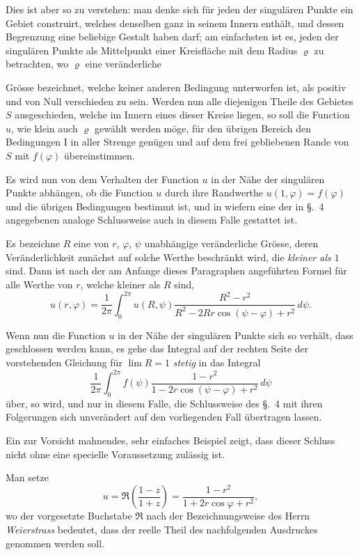 \documentclass{article}
\begin{document}
Dies ist aber so zu verstehen: man denke sich für jeden der singulären Punkte ein Gebiet construirt, welches denselben ganz in seinem Innern enthält, und dessen Begrenzung eine beliebige Gestalt haben darf; am einfachsten ist es, jeden der singulären Punkte als Mittelpunkt einer Kreisfläche mit dem Radius $\varrho$ zu betrachten, wo $\varrho$ eine veränderliche

Grösse bezeichnet, welche keiner anderen Bedingung unterworfen ist, als positiv und von Null verschieden zu sein. Werden nun alle diejenigen Theile des Gebietes $S$ ausgeschieden, welche im Innern eines dieser Kreise liegen, so soll die Function $u$, wie klein auch $\varrho$ gewählt werden möge, für den übrigen Bereich den Bedingungen I in aller Strenge genügen und auf dem frei gebliebenen Rande von $S$ mit $f(\varphi)$ übereinstimmen.

Es wird nun von dem Verhalten der Function $u$ in der Nähe der singulären Punkte abhängen, ob die Function $u$ durch ihre Randwerthe $u(1, \varphi) = f(\varphi)$ und die übrigen Bedingungen bestimmt ist, und in wiefern eine der in §.~4 angegebenen analoge Schlussweise auch in diesem Falle gestattet ist.

Es bezeichne $R$ eine von $r$, $\varphi$, $\psi$ unabhängige veränderliche Grösse, deren Veränderlichkeit zunächst auf solche Werthe beschränkt wird, die \emph{kleiner als $1$} sind. Dann ist nach der am Anfange dieses Paragraphen angeführten Formel für alle Werthe von $r$, welche kleiner als $R$ sind,
\[
u(r, \varphi) = \frac{1}{2\pi} \int_0^{2\pi} u(R, \psi) \frac{R^2 - r^2}{R^2 - 2Rr \cos(\psi - \varphi) + r^2}\,d\psi.
\]

Wenn nun die Function $u$ in der Nähe der singulären Punkte sich so verhält, dass geschlossen werden kann, es gehe das Integral auf der rechten Seite der vorstehenden Gleichung für $\lim R = 1$ \emph{stetig} in das Integral
\[
\frac{1}{2\pi} \int_0^{2\pi} f(\psi) \frac{1 - r^2}{1 - 2r \cos(\psi - \varphi) + r^2}\,d\psi
\]
über, so wird, und nur in diesem Falle, die Schlussweise des §.~4 mit ihren Folgerungen sich unverändert auf den vorliegenden Fall übertragen lassen.

Ein zur Vorsicht mahnendes, sehr einfaches Beispiel zeigt, dass dieser Schluss nicht ohne eine specielle Voraussetzung zulässig ist.

Man setze
\[
u = \Re\left(\frac{1 - z}{1 + z}\right) = \frac{1 - r^2}{1 + 2r \cos\varphi + r^2},
\]
wo der vorgesetzte Buchstabe $\Re$ nach der Bezeichnungsweise des Herrn \emph{Weierstrass} bedeutet, dass der reelle Theil des nachfolgenden Ausdruckes genommen werden soll.
\end{document}
